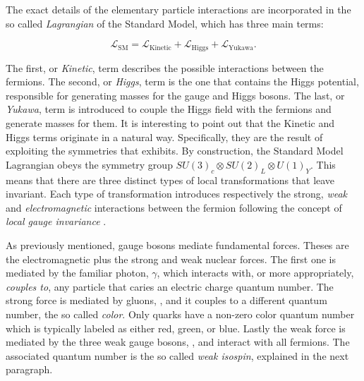 The exact details of the elementary particle interactions are incorporated in the so called
{\it Lagrangian} of the Standard Model, which has three main terms:

\begin{equation}
\mathscr{L}_{\text{SM}} =
\mathscr{L}_{\text{Kinetic}} + \mathscr{L}_{\text{Higgs}} + \mathscr{L}_{\text{Yukawa}}.
\label{lagrangian}
\end{equation}

\noindent The first, or {\it Kinetic}, term describes the possible interactions between the fermions.
The second, or {\it Higgs}, term is the one that contains the Higgs potential, responsible for generating
masses for the gauge and Higgs bosons. The last, or {\it Yukawa}, term is introduced to
couple the Higgs field with the fermions and generate masses for them.
It is interesting to point out that the Kinetic and Higgs terms originate in a natural way.
Specifically, they are the result of exploiting the symmetries that  exhibits.
By construction, the Standard Model Lagrangian obeys the symmetry group $SU(3)_c\otimes SU(2)_L\otimes U(1)_Y$.
This means that there are three distinct types of local transformations that leave  invariant.
Each type of transformation introduces respectively the strong, {\it weak} and {\it electromagnetic} interactions
between the fermion following the concept of {\it local gauge invariance} \cite{aitchison,halzen1984quarks}.

As previously mentioned, gauge bosons mediate fundamental forces. Theses are the electromagnetic plus the strong and weak nuclear forces.
The first one is mediated by the familiar photon, $\gamma$, which interacts with, or more appropriately, {\it couples to}, any particle that
caries an electric charge quantum number. The strong force is mediated by gluons, \gluon,
and it couples to a different quantum number, the so called {\it color}.
Only quarks have a non-zero color quantum number which is typically labeled as either red, green, or blue. Lastly the
weak force is mediated by the three weak gauge bosons, \Wpm, \Z and interact with all fermions.
The associated quantum number is the so called {\it weak isospin}, explained in the next paragraph.

